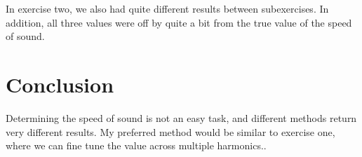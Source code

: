 \documentclass[12pt]{article}
\begin{document}
In exercise two, we also had quite different results between
subexercises. In addition, all three values were off by quite a bit
from the true value of the speed of sound.

\section*{Conclusion}
Determining the speed of sound is not an easy task, and different
methods return very different results. My preferred method would be
similar to exercise one, where we can fine tune the value across
multiple harmonics..
\end{document}
